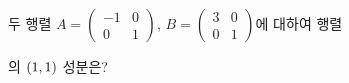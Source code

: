 두 행렬 $A=\begin{pmatrix} -1 & 0 \\ 0 & 1 \end{pmatrix}$, $B=\begin{pmatrix} 3 & 0 \\ 0 & 1 \end{pmatrix}$에 대하여 행렬\par\smallskip{}\par\smallskip\noindent 의 $(1{,}\mkern3mu\mathopen{}1)$ 성분은?
